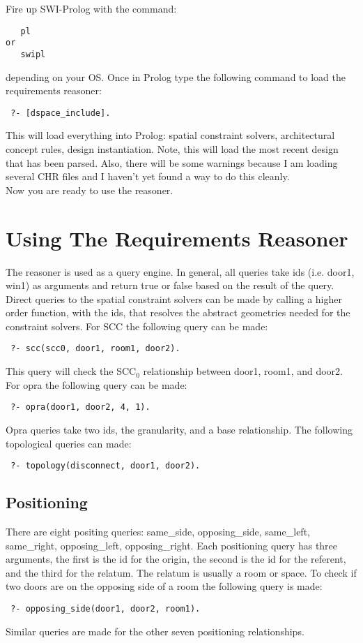 \documentclass[12pt]{article}
\begin{document}
\noindent Fire up SWI-Prolog with the command: 
\begin{verbatim} 
   pl
or 
   swipl
\end{verbatim} depending on your OS. Once in Prolog type the following command to load the requirements reasoner:
\begin{verbatim} 
 ?- [dspace_include].
\end{verbatim} This will load everything into Prolog: spatial constraint solvers, architectural concept rules, design instantiation. Note, this will load the most recent design that has been parsed. Also, there will be some warnings because I am loading several CHR files and I haven't yet found a way to do this cleanly. \\

\noindent Now you are ready to use the reasoner.

\section{Using The Requirements Reasoner}
The reasoner is used as a query engine. In general, all queries take ids (i.e. door1, win1) as arguments and return true or false based on the result of the query. \\

\noindent Direct queries to the spatial constraint solvers can be made by calling a higher order function, with the ids, that resolves the abstract geometries needed for the constraint solvers. For SCC the following query can be made:
\begin{verbatim}
 ?- scc(scc0, door1, room1, door2).
\end{verbatim} This query will check the SCC$_{0}$ relationship between door1, room1, and door2. For opra the following query can be made:
\begin{verbatim}
 ?- opra(door1, door2, 4, 1).
\end{verbatim} Opra queries take two ids, the granularity, and a base relationship. The following topological queries can made:
\begin{verbatim}
 ?- topology(disconnect, door1, door2).
\end{verbatim}

\subsection{Positioning}
There are eight positing queries: same_side, opposing_side, same_left, same_right, opposing_left, opposing_right. Each positioning query has three arguments, the first is the id for the origin, the second is the id for the referent, and the third for the relatum. The relatum is usually a room or space. To check if two doors are on the opposing side of a room the following query is made:
\begin{verbatim}
 ?- opposing_side(door1, door2, room1).
\end{verbatim} Similar queries are made for the other seven positioning relationships.
\end{document}
